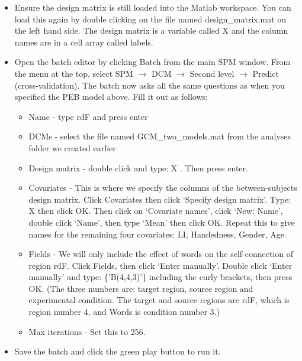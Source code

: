 \documentclass{article}
\begin{document}
\begin{itemize}
    \item Ensure the design matrix is still loaded into the Matlab workspace. You can load this again by double clicking on the file named design\_matrix.mat on the left hand side. The design matrix is a variable called X and the column names are in a cell array called labels.
    
    \item Open the batch editor by clicking Batch from the main SPM window. From the menu at the top, select SPM $\rightarrow$ DCM $\rightarrow$ Second level $\rightarrow$ Predict (cross-validation). The batch now asks all the same questions as when you specified the PEB model above. Fill it out as follows:
    \begin{itemize}
        \item Name - type rdF and press enter
        
        \item DCMs - select the file named GCM\_two\_models.mat from the analyses folder we created earlier
        
        \item Design matrix - double click and type: X  . Then press enter.
        
        \item Covariates - This is where we specify the columns of the  between-subjects design matrix. Click Covariates then click `Specify design matrix'. Type: X then click OK. Then click on `Covariate names', click `New: Name', double click `Name', then type `Mean' then click OK.  Repeat this to give names for the remaining four covariates: LI, Handedness, Gender, Age.
        
        \item Fields - We will only include the effect of words on the self-connection of region rdF. Click Fields, then click `Enter manually'. Double click `Enter manually' and type: \{{'B(4,4,3)'}\} including the curly brackets, then press OK. (The three numbers are: target region, source region and experimental condition. The target and source regions are rdF, which is region number 4, and Words is condition number 3.)
        
        \item Max iterations - Set this to 256.

    \end{itemize}
    
    \item Save the batch and click the green play button to run it.
    
\end{itemize}
\end{document}
